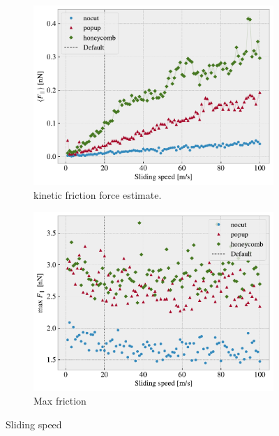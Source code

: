 \begin{figure}[H]
  \centering
  \begin{subfigure}[t]{0.49\textwidth}
      \centering
      \includegraphics[width=\textwidth]{figures/baseline/variables_vel_mean_fixmove.pdf}
      \caption{kinetic friction force estimate.}
      \label{fig:var_vel_mean}
  \end{subfigure}
  \hfill
  \begin{subfigure}[t]{0.49\textwidth}
      \centering
      \includegraphics[width=\textwidth]{figures/baseline/variables_vel_max_fixmove.pdf}
      \caption{Max friction}
      \label{fig:var_vel_max}
  \end{subfigure}
  \hfill
     \caption{Sliding speed}
     \label{fig:var_vel}
\end{figure}



